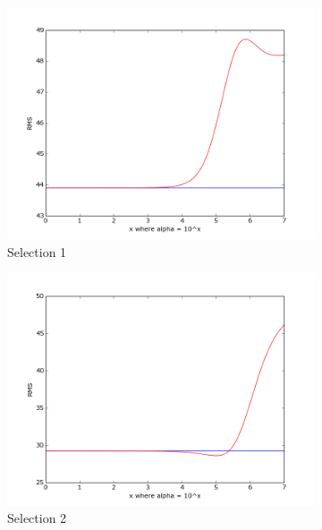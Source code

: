 \documentclass{article}
\begin{document}
\begin{figure}[!ht]
    \centering
    \begin{subfigure}[b]{0.4\textwidth}
        \includegraphics[width=\textwidth]{Part2/II221.png}
        \caption{Selection 1}
        \label{fig:II221}
    \end{subfigure}
    \begin{subfigure}[b]{0.4\textwidth}
        \includegraphics[width=\textwidth]{Part2/II222.png}
        \caption{Selection 2}
        \label{fig:II222}
    \end{subfigure}
    \begin{subfigure}[b]{0.4\textwidth}

\end{subfigure}
\end{figure}
\end{document}
